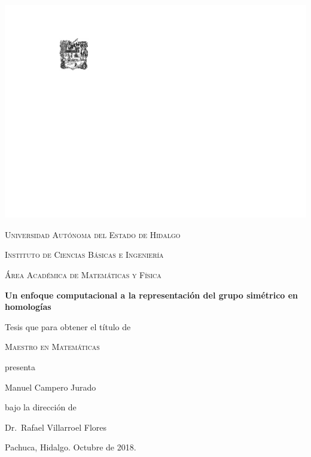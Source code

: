 \documentclass[12pt]{book}
\theoremstyle{definition}
\newcounter{in}
\newcommand{\elespacio}{1.4cm}
\begin{document}
\mainmatter 
\begin{titlepage}
  \begin{center}
    \null
    \vspace*{\fill}

    \includegraphics[scale=1.2,bb=55 20 0 0]{escudouaeh.pdf}

    \vspace*{\elespacio}

    \textsc{Universidad Autónoma del Estado de Hidalgo}

    \textsc{Instituto de Ciencias Básicas e Ingeniería}

    \textsc{Área Académica de Matemáticas y Física}

    \vspace*{\elespacio}

    {\Huge\bfseries Un enfoque computacional a la representación del grupo simétrico en homologías\par}

    \vspace*{\elespacio}

    {\large Tesis que para obtener el título de}

    \vspace*{\elespacio}

    {\Large\textsc{Maestro en Matemáticas}}

    \vspace*{\elespacio}

    {\large presenta}

    \vspace*{\elespacio}

    {\Huge Manuel Campero Jurado}

    \vspace*{\elespacio}

    {\large bajo la dirección de}

    \bigskip

    {\Large Dr.~Rafael Villarroel Flores}

    \bigskip

    {Pachuca, Hidalgo. Octubre de 2018.}

    \vspace*{\fill}

  \end{center}
\end{titlepage}
\end{document}
